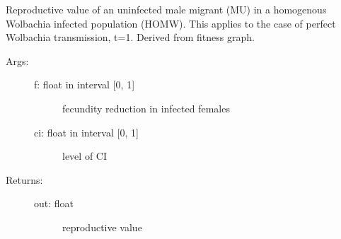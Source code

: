 \documentclass[letterpaper,10pt,english]{sphinxmanual}
\begin{document}
\begin{fulllineitems}
\label{index:wspec.analytical.reproval_MUHOMW}
Reproductive value of an uninfected male migrant (MU) in a 
homogenous Wolbachia infected population (HOMW). This applies to 
the case of perfect Wolbachia transmission, t=1.
Derived from fitness graph.
\begin{description}
\item[{Args:}] \leavevmode\begin{description}
\item[{f: float in interval {[}0, 1{]}}] \leavevmode
fecundity reduction in infected females

\item[{ci: float in interval {[}0, 1{]}}] \leavevmode
level of CI

\end{description}

\item[{Returns:}] \leavevmode\begin{description}
\item[{out: float}] \leavevmode
reproductive value

\end{description}

\end{description}

\end{fulllineitems}

\end{document}
